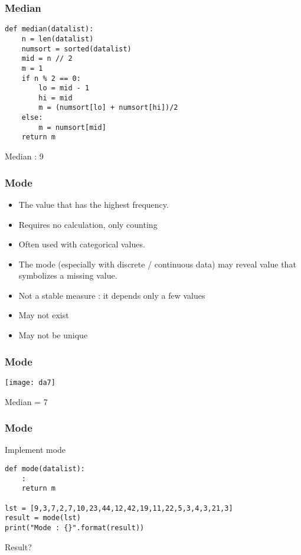 \begin{frame}[fragile]\frametitle{Median}
\begin{lstlisting}
def median(datalist):
    n = len(datalist)
    numsort = sorted(datalist)
    mid = n // 2
    m = 1
    if n % 2 == 0:
        lo = mid - 1
        hi = mid
        m = (numsort[lo] + numsort[hi])/2
    else:
        m = numsort[mid]
    return m
\end{lstlisting}
Median : 9
\end{frame}



\begin{frame}[fragile]\frametitle{Mode}	

\begin{itemize}
\item The value that has the highest frequency.
\item Requires no calculation, only counting
\item Often used with categorical values.
\item The mode (especially with discrete / continuous data) may reveal value that symbolizes a missing value.
\item Not a stable measure : it depends only a few values
\item May not exist
\item May not be unique
\end{itemize}

\end{frame}

\begin{frame}[fragile]\frametitle{Mode}	
\begin{center}
\texttt{[image: da7]}
\end{center}
Median = 7
\end{frame}


\begin{frame}[fragile]\frametitle{Mode}
Implement mode
\begin{lstlisting}
def mode(datalist):
	:
	return m

lst = [9,3,7,2,7,10,23,44,12,42,19,11,22,5,3,4,3,21,3]
result = mode(lst)
print("Mode : {}".format(result))
\end{lstlisting}
Result?
\end{frame}

